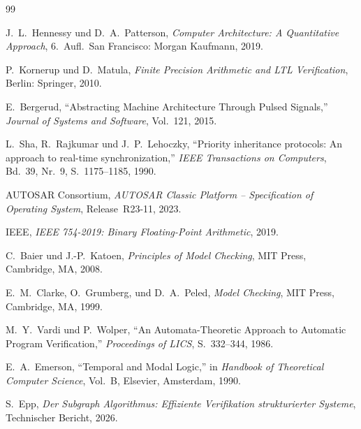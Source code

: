 \documentclass[a4paper,12pt]{article}
\theoremstyle{definition}
\begin{document}
\begin{thebibliography}{99}
	
	J.~L.\ Hennessy und D.~A.\ Patterson,
	\textit{Computer Architecture: A Quantitative Approach},
	6.~Aufl.\ San Francisco: Morgan Kaufmann, 2019.
	
	P.~Kornerup und D.~Matula,
	\textit{Finite Precision Arithmetic and LTL Verification},
	Berlin: Springer, 2010.
	
	E.~Bergerud,
	``Abstracting Machine Architecture Through Pulsed Signals,''
	\textit{Journal of Systems and Software}, Vol.~121, 2015.
	
	L.~Sha, R.~Rajkumar und J.~P.~Lehoczky,
	``Priority inheritance protocols: An approach to real-time synchronization,''
	\textit{IEEE Transactions on Computers}, Bd.~39, Nr.~9, S.~1175--1185, 1990.
	
	AUTOSAR Consortium,
	\textit{AUTOSAR Classic Platform -- Specification of Operating System},
	Release~R23-11, 2023.
	
	IEEE,
	\textit{IEEE 754-2019: Binary Floating-Point Arithmetic},
	2019.
	
	C.~Baier und J.-P.~Katoen,
	\textit{Principles of Model Checking},
	MIT Press, Cambridge, MA, 2008.
	
	E.~M.\ Clarke, O.~Grumberg, und D.~A.\ Peled,
	\textit{Model Checking},
	MIT Press, Cambridge, MA, 1999.
	
	M.~Y.\ Vardi und P.~Wolper,
	``An Automata-Theoretic Approach to Automatic Program Verification,''
	\textit{Proceedings of LICS}, S.~332--344, 1986.
	
	E.~A.\ Emerson,
	``Temporal and Modal Logic,''
	in \textit{Handbook of Theoretical Computer Science}, Vol.~B, Elsevier, Amsterdam, 1990.
	
	S.~Epp,
	\textit{Der Subgraph Algorithmus: Effiziente Verifikation strukturierter Systeme},
	Technischer Bericht, 2026.
	
\end{thebibliography}
	
\end{document}
